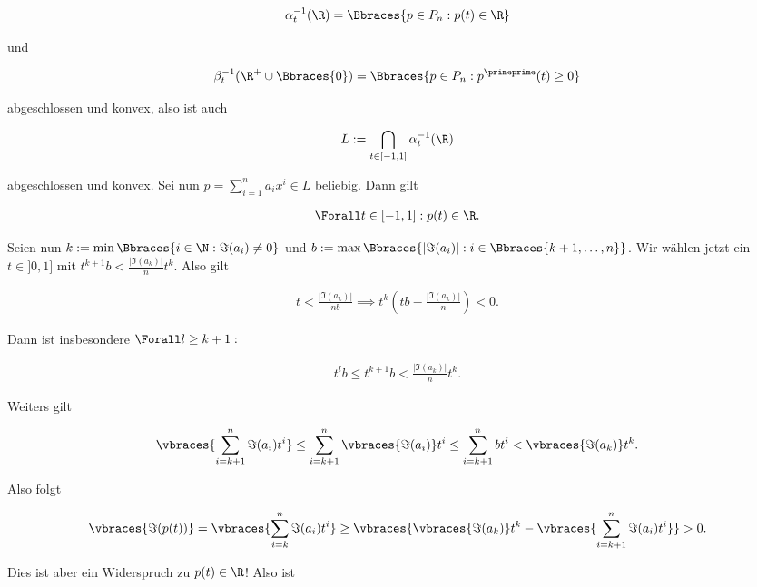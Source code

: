 \begin{solution}
\begin{align*}
  \alpha_t^{-1}(\R)
  =
  \Bbraces{p \in P_n: p(t) \in \R}
\end{align*}

und

\begin{align*}
  \beta_t^{-1}(\R^+ \cup \Bbraces{0})
  =
  \Bbraces{p \in P_n: p^\primeprime(t) \geq 0}
\end{align*}

abgeschlossen und konvex, also ist auch

\begin{align*}
  L := \bigcap_{t \in [-1, 1]}\alpha_t^{-1}(\R)
\end{align*}

abgeschlossen und konvex.
Sei nun $p = \sum_{i=1}^n a_i x^i \in L$ beliebig.
Dann gilt

\begin{align*}
  \Forall t \in [-1, 1]: p(t) \in \R.
\end{align*}

Seien nun $k := \min \Bbraces{i \in \N: \Im(a_i) \neq 0}$
und $b := \max \Bbraces{|\Im(a_i)|: i \in \Bbraces{k+1, \dots, n}}$.
Wir wählen jetzt ein $t \in ]0, 1]$ mit $t^{k+1} b < \frac{|\Im(a_k)|}{n} t^k$.
Also gilt

\begin{align*}
  t < \frac{|\Im(a_k)|}{nb}
  \implies
  t^k(tb - \frac{|\Im(a_k)|}{n}) < 0.
\end{align*}

Dann ist insbesondere $\Forall l \geq k + 1:$

\begin{align*}
  t^lb
  \leq
  t^{k+1}b
  <
  \frac{|\Im(a_k)|}{n}t^k.
\end{align*}

Weiters gilt

\begin{align*}
  \vbraces{\sum_{i = k + 1}^n \Im(a_i)t^i}
  \leq
  \sum_{i = k + 1}^n \vbraces{\Im(a_i)} t^i
  \leq
  \sum_{i = k+1}^n b t^i
  <
  \vbraces{\Im(a_k)} t^k.
\end{align*}

Also folgt

\begin{align*}
  \vbraces{\Im(p(t))}
  =
  \vbraces{\sum_{i = k}^n \Im(a_i)t^i}
  \geq
  \vbraces
  {
    \vbraces{\Im(a_k)} t^k -
    \vbraces{\sum_{i = k+1}^n \Im(a_i)t^i}
  } > 0.
\end{align*}

Dies ist aber ein Widerspruch zu $p(t) \in \R$!
Also ist


\end{solution}
